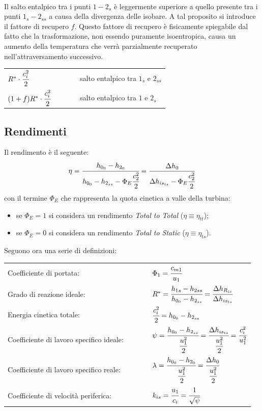 \\Il salto entalpico tra i punti $1 - 2_s$ è leggermente superiore a quello presente tra i punti $1_s - 2_{ss}$ a causa della divergenza delle isobare. A tal proposito si introduce il fattore di recupero $f$. Questo fattore di recupero è fisicamente spiegabile dal fatto che la trasformazione, non essendo puramente isoentropica, causa un aumento della temperatura che verrà parzialmente recuperato nell'attraversamento successivo. 
\begin{center}
\begin{tabular}{l l l l l}
	$R^* \cdot \cfrac{c_i^2}{2}$ &&&& salto entalpico tra $1_s$ e $2_{ss}$\\
	$(1+f)R^* \cdot \cfrac{c_i^2}{2}$ &&&& salto entalpico tra $1$ e $2_s$\\
\end{tabular}
\end{center}
\subsection{Rendimenti}
Il rendimento è il seguente:
\begin{align*}
\eta = \cfrac{h_{0_0} - h_{2_0}}{h_{0_0} - h_{2_{ss}} - \Phi_E \cfrac{c_2^2}{2}} = \frac{\Delta h_0}{\Delta h_{is_{ts}}-\Phi_E \cfrac{c_2^2}{2}}
\end{align*}
con il termine $\Phi_E$ che rappresenta la quota cinetica a valle della turbina:
\begin{itemize}
	\item se $\Phi_E=1$ si considera un rendimento \textit{Total to Total} ($\eta \equiv \eta_{tt}$);
	\item se $\Phi_E=0$ si considera un rendimento \textit{Total to Static} ($\eta \equiv \eta_{ts}$).
\end{itemize}
Seguono ora una serie di definizioni:\\
\renewcommand\arraystretch{3}
\begin{tabular}{l l l l l}
	Coefficiente di portata: & & & &  $\Phi_1 = \cfrac{c_{m1}}{u_1}$\\
	Grado di reazione ideale: & & & & $R^* = \cfrac{h_{1s} - h_{2ss}}{h_{0_0} - h_{2_{ss}}} = \cfrac{\Delta h_{R_{is}}}{\Delta h_{is_{ts}}}$\\
	Energia cinetica totale: & & & &  $\cfrac{c_i^2}{2}=h_{0_0} - h_{2_{ss}}$\\
	Coefficiente di lavoro specifico ideale: & & & &  $\psi = \cfrac{h_{0_0} - h_{2_{ss}}}{\cfrac{u_1^2}{2}} = \cfrac{\Delta h_{is_{ts}}}{\cfrac{u_1^2}{2}}= \cfrac{c_i^2}{u_1^2}$\\
	Coefficiente di lavoro specifico reale: & & & &  $\lambda = \cfrac{h_{0_0} - h_{2_0}}{\cfrac{u_1^2}{2}}= \cfrac{\Delta h_0}{\cfrac{u_1^2}{2}}$\\
	Coefficiente di velocità periferica: & & & &  $k_{is} = \cfrac{u_1}{c_i} = \cfrac{1}{\sqrt{\psi}}$\\
\end{tabular}

